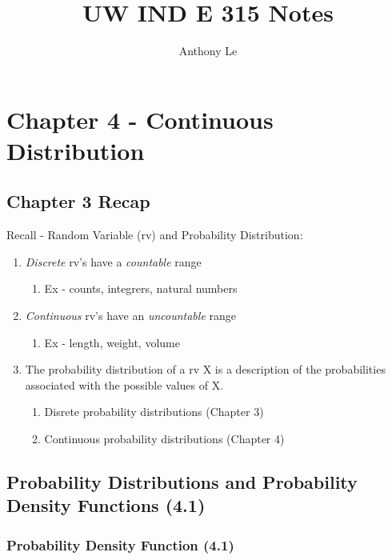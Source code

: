 \documentclass[../INDE315.tex]{subfiles}
\title{UW IND E 315 Notes}
\author{Anthony Le}
\begin{document}
\pagestyle{fancy}
\fancyhead{}


\section*{Chapter 4 - Continuous Distribution}

\subsection*{Chapter 3 Recap}
Recall - Random Variable (rv) and Probability Distribution:
\begin{enumerate}
    \item \emph{Discrete} rv's have a \emph{countable} range
        \begin{enumerate}
            \item Ex - counts, integrers, natural numbers
        \end{enumerate}
    \item \emph{Continuous} rv's have an \emph{uncountable} range
        \begin{enumerate}
            \item Ex - length, weight, volume
        \end{enumerate}
    \item The probability distribution of a rv X is a description of the probabilities associated with the possible values of X.
        \begin{enumerate}
            \item Disrete probability distributions (Chapter 3)
            \item Continuous probability distributions (Chapter 4)
        \end{enumerate}
\end{enumerate}

\subsection*{Probability Distributions and Probability Density Functions (4.1)}
\subsubsection*{Probability Density Function (4.1)}
\end{document}
